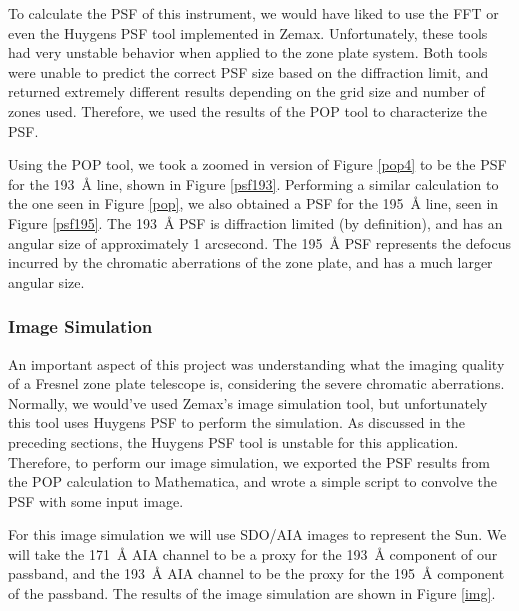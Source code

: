 \documentclass[10pt,letterpaper]{article}
\begin{document}
				To calculate the PSF of this instrument, we would have liked to use the FFT or even the Huygens PSF tool implemented in Zemax. Unfortunately, these tools had very unstable behavior when applied to the zone plate system. Both tools were unable to predict the correct PSF size based on the diffraction limit, and returned extremely different results depending on the grid size and number of zones used. Therefore, we used the results of the POP tool to characterize the PSF.
				
				Using the POP tool, we took a zoomed in version of Figure \ref{pop4} to be the PSF for the \SI{193}{\angstrom} line, shown in Figure \ref{psf193}. Performing a similar calculation to the one seen in Figure \ref{pop}, we also obtained a PSF for the \SI{195}{\angstrom} line, seen in Figure \ref{psf195}. The \SI{193}{\angstrom} PSF is diffraction limited (by definition), and has an angular size of approximately 1 arcsecond. The \SI{195}{\angstrom} PSF represents the defocus incurred by the chromatic aberrations of the zone plate, and has a much larger angular size.
			

			
			\subsubsection{Image Simulation}
			
				An important aspect of this project was understanding what the imaging quality of a Fresnel zone plate telescope is, considering the severe chromatic aberrations. Normally, we would've used Zemax's image simulation tool, but unfortunately this tool uses Huygens PSF to perform the simulation. As discussed in the preceding sections, the Huygens PSF tool is unstable for this application. Therefore, to perform our image simulation, we exported the PSF results from the POP calculation to Mathematica, and wrote a simple script to convolve the PSF with some input image.
				
				For this image simulation we will use SDO/AIA images to represent the Sun. We will take the \SI{171}{\angstrom} AIA channel to be a proxy for the \SI{193}{\angstrom} component of our passband, and the \SI{193}{\angstrom} AIA channel to be the proxy for the \SI{195}{\angstrom} component of the passband. The results of the image simulation are shown in Figure \ref{img}.
			
\end{document}
